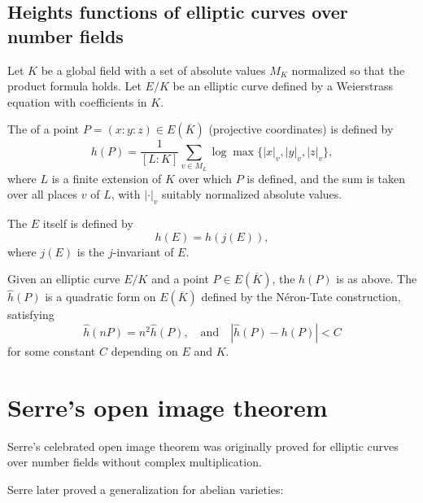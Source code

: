 \subsection{Heights functions of elliptic curves over number fields}


\begin{definition}
Let $K$ be a global field with a set of absolute values $M_K$ normalized so that the product formula holds. Let $E/K$ be an elliptic curve defined by a Weierstrass equation with coefficients in $K$.

The  of a point $P = (x:y:z) \in E(\overline{K})$ (projective coordinates) is defined by
$$h(P) = \frac{1}{[L : K]} \sum_{v \in M_L} \log \max\{ |x|_v, |y|_v, |z|_v \},$$
where $L$ is a finite extension of $K$ over which $P$ is defined, and the sum is taken over all places $v$ of $L$, with $|\cdot|_v$ suitably normalized absolute values.

The  $E$ itself is defined by
$$h(E) = h(j(E)),$$
where $j(E)$ is the $j$-invariant of $E$.
\end{definition}

\begin{definition}
Given an elliptic curve $E/K$ and a point $P \in E(\overline{K})$, the  $h(P)$ is as above. The  $\hat{h}(P)$ is a quadratic form on $E(\overline{K})$ defined by the Néron-Tate construction, satisfying
\[
\hat{h}(nP) = n^2 \hat{h}(P), \quad \text{and} \quad |\hat{h}(P) - h(P)| < C
\]
for some constant $C$ depending on $E$ and $K$.
\end{definition}



\section{Serre's open image theorem}

Serre's celebrated open image theorem was originally proved for elliptic curves over number fields without complex multiplication. 


Serre later proved a generalization for abelian varieties:







